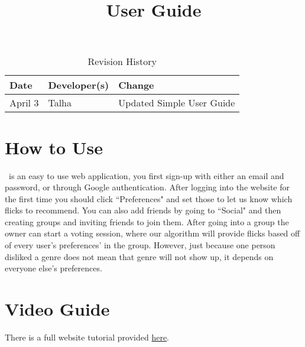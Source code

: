\documentclass{article}
\title{User Guide\\\progname}
\author{\authname}
\date{}
\begin{document}
\begin{table}[hp]
\caption{Revision History} \label{TblRevisionHistory}
\begin{tabularx}{\textwidth}{llX}
\toprule
\textbf{Date} & \textbf{Developer(s)} & \textbf{Change}\\
\midrule
April 3 & Talha & Updated Simple User Guide\\
\bottomrule
\end{tabularx}
\end{table}

\newpage

\maketitle

\section{How to Use}
\progname ~is an easy to use web application, you first sign-up with either an email and password, or through Google authentication. After logging into the website for the first time you should click ``Preferences" and set those to let us know which flicks to recommend. You can also add friends by going to ``Social" and then creating groups and inviting friends to join them. After going into a group the owner can start a voting session, where our algorithm will provide flicks based off of every user's preferences' in the group. However, just because one person disliked a genre does not mean that genre will not show up, it depends on everyone else's preferences.

\section{Video Guide}
There is a full website tutorial provided \href{run:./UserGuide.mp4}{here}.
\end{document}
